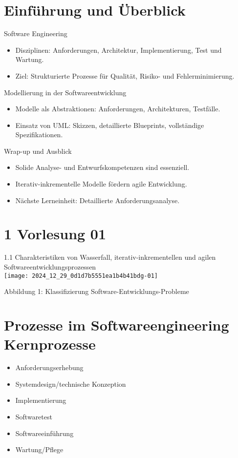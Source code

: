\section{Einführung und Überblick}

\begin{definition}{Software Engineering}
\begin{itemize}
    \item Disziplinen: Anforderungen, Architektur, Implementierung, Test und Wartung.
    \item Ziel: Strukturierte Prozesse für Qualität, Risiko- und Fehlerminimierung.
\end{itemize}
\end{definition}

\begin{definition}{Modellierung in der Softwareentwicklung}
\begin{itemize}
    \item Modelle als Abstraktionen: Anforderungen, Architekturen, Testfälle.
    \item Einsatz von UML: Skizzen, detaillierte Blueprints, vollständige Spezifikationen.
    \end{itemize}
\end{definition}

\begin{definition}{Wrap-up und Ausblick}
\begin{itemize}
    \item Solide Analyse- und Entwurfskompetenzen sind essenziell.
    \item Iterativ-inkrementelle Modelle fördern agile Entwicklung.
    \item Nächste Lerneinheit: Detaillierte Anforderungsanalyse.
\end{itemize}
\end{definition}

\section*{1 Vorlesung 01}
1.1 Charakteristiken von Wasserfall, iterativ-inkrementellen und agilen Softwareentwicklungsprozessen\\
\texttt{[image: 2024\_12\_29\_0d1d7b5551ea1b4b41bdg-01]}

Abbildung 1: Klassifizierung Software-Entwicklungs-Probleme

\section*{Prozesse im Softwareengineering Kernprozesse}
\begin{itemize}
  \item Anforderungserhebung
  \item Systemdesign/technische Konzeption
  \item Implementierung
  \item Softwaretest
  \item Softwareeinführung
  \item Wartung/Pflege
\end{itemize}

